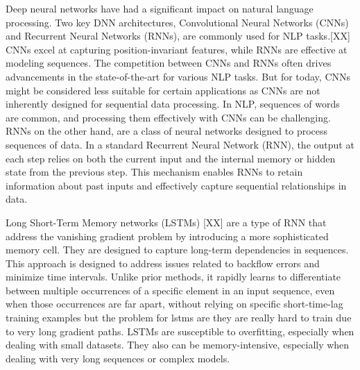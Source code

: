\documentclass[conference]{IEEEtran}
\begin{document}
Deep neural networks have had a significant impact on natural language processing. Two key DNN architectures, Convolutional Neural Networks (CNNs) and Recurrent Neural Networks (RNNs), are commonly used for NLP tasks.[XX] CNNs excel at capturing position-invariant features, while RNNs are effective at modeling sequences. The competition between CNNs and RNNs often drives advancements in the state-of-the-art for various NLP tasks. But for today, CNNs might be considered less suitable for certain applications as CNNs are not inherently designed for sequential data processing. In NLP, sequences of words are common, and processing them effectively with CNNs can be challenging. RNNs on the other hand,  are a class of neural networks designed to process sequences of data. In a standard Recurrent Neural Network (RNN), the output at each step relies on both the current input and the internal memory or hidden state from the previous step. This mechanism enables RNNs to retain information about past inputs and effectively capture sequential relationships in data.


 Long Short-Term Memory networks (LSTMs) [XX] are a type of RNN that address the vanishing gradient problem by introducing a more sophisticated memory cell. They are designed to capture long-term dependencies in sequences. This approach is designed to address issues related to backflow errors and minimize time intervals. Unlike prior methods, it rapidly learns to differentiate between multiple occurrences of a specific element in an input sequence, even when those occurrences are far apart, without relying on specific short-time-lag training examples but the problem for lstms are they are really hard to train due to very long gradient paths. LSTMs are susceptible to overfitting, especially when dealing with small datasets. They also can be memory-intensive, especially when dealing with very long sequences or complex models.
\end{document}
